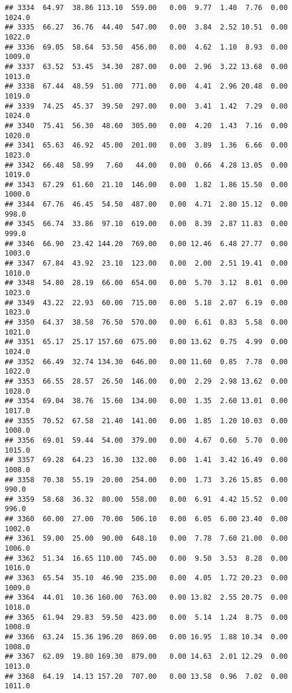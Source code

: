 \documentclass{article}\usepackage{graphicx, color}
\makeatletter
\newenvironment{kframe}{%
 \def\at@end@of@kframe{}%
 \ifinner\ifhmode%
  \def\at@end@of@kframe{\end{minipage}}%
  \begin{minipage}{\columnwidth}%
 \fi\fi%
 \def\FrameCommand##1{\hskip\@totalleftmargin \hskip-\fboxsep
 \colorbox{shadecolor}{##1}\hskip-\fboxsep
     \hskip-\linewidth \hskip-\@totalleftmargin \hskip\columnwidth}%
 \MakeFramed {\advance\hsize-\width
   \@totalleftmargin\z@ \linewidth\hsize
   \@setminipage}}%
 {\par\unskip\endMakeFramed%
 \at@end@of@kframe}
\newenvironment{knitrout}{}{} %
\makeatother
\begin{document}
\begin{knitrout}
\begin{kframe}
\begin{verbatim}
## 3334  64.97  38.86 113.10  559.00   0.00  9.77  1.40  7.76  0.00 1024.0
## 3335  66.27  36.76  44.40  547.00   0.00  3.84  2.52 10.51  0.00 1022.0
## 3336  69.05  58.64  53.50  456.00   0.00  4.62  1.10  8.93  0.00 1009.0
## 3337  63.52  53.45  34.30  287.00   0.00  2.96  3.22 13.68  0.00 1013.0
## 3338  67.44  48.59  51.00  771.00   0.00  4.41  2.96 20.48  0.00 1019.0
## 3339  74.25  45.37  39.50  297.00   0.00  3.41  1.42  7.29  0.00 1024.0
## 3340  75.41  56.30  48.60  305.00   0.00  4.20  1.43  7.16  0.00 1020.0
## 3341  65.63  46.92  45.00  201.00   0.00  3.89  1.36  6.66  0.00 1023.0
## 3342  66.48  58.99   7.60   44.00   0.00  0.66  4.28 13.05  0.00 1019.0
## 3343  67.29  61.60  21.10  146.00   0.00  1.82  1.86 15.50  0.00 1000.0
## 3344  67.76  46.45  54.50  487.00   0.00  4.71  2.80 15.12  0.00  998.0
## 3345  66.74  33.86  97.10  619.00   0.00  8.39  2.87 11.83  0.00  999.0
## 3346  66.90  23.42 144.20  769.00   0.00 12.46  6.48 27.77  0.00 1003.0
## 3347  67.84  43.92  23.10  123.00   0.00  2.00  2.51 19.41  0.00 1010.0
## 3348  54.80  28.19  66.00  654.00   0.00  5.70  3.12  8.01  0.00 1023.0
## 3349  43.22  22.93  60.00  715.00   0.00  5.18  2.07  6.19  0.00 1023.0
## 3350  64.37  38.58  76.50  570.00   0.00  6.61  0.83  5.58  0.00 1021.0
## 3351  65.17  25.17 157.60  675.00   0.00 13.62  0.75  4.99  0.00 1024.0
## 3352  66.49  32.74 134.30  646.00   0.00 11.60  0.85  7.78  0.00 1022.0
## 3353  66.55  28.57  26.50  146.00   0.00  2.29  2.98 13.62  0.00 1028.0
## 3354  69.04  38.76  15.60  134.00   0.00  1.35  2.60 13.01  0.00 1017.0
## 3355  70.52  67.58  21.40  141.00   0.00  1.85  1.20 10.03  0.00 1008.0
## 3356  69.01  59.44  54.00  379.00   0.00  4.67  0.60  5.70  0.00 1015.0
## 3357  69.28  64.23  16.30  132.00   0.00  1.41  3.42 16.49  0.00 1008.0
## 3358  70.38  55.19  20.00  254.00   0.00  1.73  3.26 15.85  0.00  990.0
## 3359  58.68  36.32  80.00  558.00   0.00  6.91  4.42 15.52  0.00  996.0
## 3360  60.00  27.00  70.00  506.10   0.00  6.05  6.00 23.40  0.00 1002.0
## 3361  59.00  25.00  90.00  648.10   0.00  7.78  7.60 21.00  0.00 1006.0
## 3362  51.34  16.65 110.00  745.00   0.00  9.50  3.53  8.28  0.00 1016.0
## 3363  65.54  35.10  46.90  235.00   0.00  4.05  1.72 20.23  0.00 1009.0
## 3364  44.01  10.36 160.00  763.00   0.00 13.82  2.55 20.75  0.00 1018.0
## 3365  61.94  29.83  59.50  423.00   0.00  5.14  1.24  8.75  0.00 1008.0
## 3366  63.24  15.36 196.20  869.00   0.00 16.95  1.88 10.34  0.00 1008.0
## 3367  62.09  19.80 169.30  879.00   0.00 14.63  2.01 12.29  0.00 1013.0
## 3368  64.19  14.13 157.20  707.00   0.00 13.58  0.96  7.02  0.00 1011.0

\end{verbatim}
\end{kframe}
\end{knitrout}
\end{document}

